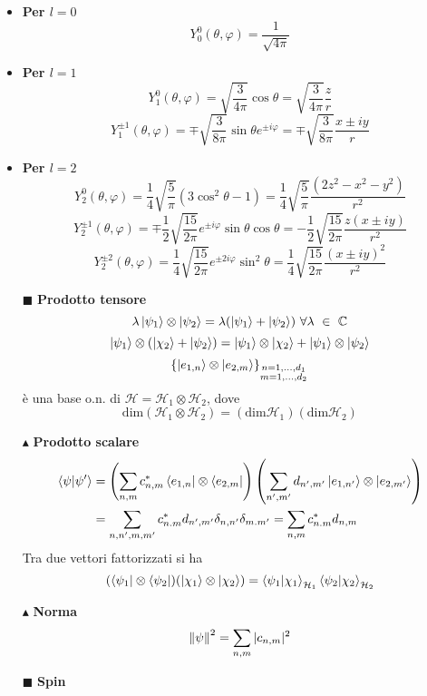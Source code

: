 \documentclass{book}
\newcommand{\g}{\textbf}
\newcommand{\e}{\begin{equation}}
\newcommand{\ex}{\end{equation} }
\renewcommand{\it}{\item[$\cdot$]}
\begin{document}
\begin{multicols}{4}
\begin{itemize}
    \it \g{Per $l = 0$}
        \e{Y^0_0(\theta, \varphi) = \frac{1}{\sqrt{4\pi}}} \ex

    \it \g{Per $l = 1$}
        \e{Y^0_1(\theta, \varphi) = \sqrt{\frac{3}{4\pi}} \cos\theta = \sqrt{\frac{3}{4\pi}} \frac{z}{r}} \ex
        \e{Y^{\pm 1}_1(\theta, \varphi) = \mp \sqrt{\frac{3}{8\pi}} \sin\theta e^{\pm i\varphi} = \mp \sqrt{\frac{3}{8\pi}} \frac{x \pm iy}{r}} \ex

    \it \g{Per $l = 2$}
        \e{Y^0_2(\theta, \varphi) = \frac{1}{4} \sqrt{\frac{5}{\pi}} (3\cos^2\theta - 1) = \frac{1}{4} \sqrt{\frac{5}{\pi}} \frac{(2z^2 - x^2 - y^2)}{r^2}} \ex
        \e{Y^{\pm 1}_2(\theta, \varphi) = \mp\frac{1}{2} \sqrt{\frac{15}{2\pi}} e^{\pm i\varphi} \sin\theta \cos\theta = -\frac{1}{2} \sqrt{\frac{15}{2\pi}} \frac{z(x \pm iy)}{r^2}} \ex
        \e{Y^{\pm 2}_2(\theta, \varphi) = \frac{1}{4} \sqrt{\frac{15}{2\pi}} e^{\pm 2i\varphi} \sin^2\theta = \frac{1}{4} \sqrt{\frac{15}{2\pi}} \frac{(x \pm iy)^2}{r^2}} \ex
        \item [$\blacksquare$] \g{Prodotto tensore}
        \e{\lambda \ket{\psi_{1}} \otimes \ket{\psi_{2}} = \lambda (\ket{\psi_{1}} + \ket{\psi_{2}}) \ \forall \lambda \ \in\  \mathbb{C}}\ex
\e{\ket{\psi_{1}} \otimes (\ket{\chi_{2}} + \ket{\psi_{2}}) = \ket{\psi_{1}} \otimes \ket{\chi_{2}} + \ket{\psi_{1}} \otimes \ket{\psi_{2}}}\ex
\e{\left\{ \ket{e_{1,n}} \otimes \ket{e_{2,m}} \right\}_{\substack{n = 1,\dots,d_1 \\ m = 1,\dots,d_2}}}\ex
è una base o.n. di $\mathcal{H} = \mathcal{H}_{1} \otimes \mathcal{H}_{2}$, dove
\e{\text{dim}(\mathcal{H}_{1} \otimes \mathcal{H}_{2}) = (\text{dim}\mathcal{H}_{1})(\text{dim}\mathcal{H}_{2})}\ex
    \item [$\blacktriangle$]\g{Prodotto scalare}
\begin{align}
    \braket{\psi}{\psi'} &= \left(\sum_{n,m}c_{n,m}^{*
}\bra{e_{1,n}}\otimes\bra{e_{2,m}}\right)\left(\sum_{n',m'}d_{n',m'}\ket{e_{1,n'}}\otimes\ket{e_{2,m'}}\right) \\
&= \sum_{n,n',m,m'}c_{n.m}^{*}d_{n',m'}\delta_{n,n'}\delta_{m.m'} = \sum_{n,m}c_{n.m}^{*}d_{n,m}
\end{align}
Tra due vettori fattorizzati si ha 
\e{(\bra{\psi_{1}}\otimes \bra{\psi_{2}})(\ket{\chi_{1}}\otimes\ket{\chi_{2}}) = \braket{\psi_{1}}{\chi_{1}}_{\mathcal{H}_{1}}\braket{\psi_{2}}{\chi_{2}}_{\mathcal{H}_{2}}}\ex
     \item [$\blacktriangle$]\g{Norma}
\e{\norm{\psi}^{2} = \sum_{n,m}|c_{n,m}|^{2}}\ex
\item [$\blacksquare$] \g{Spin}

\end{itemize}
\end{multicols}
\end{document}
